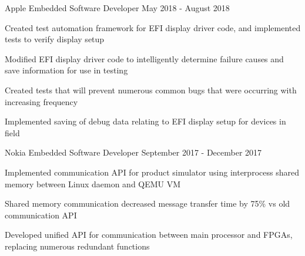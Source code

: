 \begin{cventries}
  \cventry
    {Apple} %
    {Embedded Software Developer} %
    {May 2018 - August 2018} %
    {}
    {
      \begin{cvitems} %
        \item {Created test automation framework for EFI display driver code, and implemented tests to verify display setup}
        \item {Modified EFI display driver code to intelligently determine failure causes and save information for use in testing}
        \item {Created tests that will prevent numerous common bugs that were occurring with increasing frequency}
        \item {Implemented saving of debug data relating to EFI display setup for devices in field}
      \end{cvitems}
    }

  \cventry
    {Nokia} %
    {Embedded Software Developer} %
    {September 2017 - December 2017} %
    {}
    {
      \begin{cvitems} %
        \item {Implemented communication API for product simulator using interprocess shared memory between Linux daemon and QEMU VM}
        \item {Shared memory communication decreased message transfer time by 75\% vs old communication API}
        \item {Developed unified API for communication between main processor and FPGAs, replacing numerous redundant functions}
      \end{cvitems}
    }


\end{cventries}
